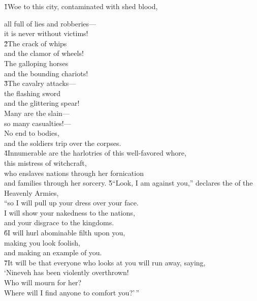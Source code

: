 \v{1}Woe to this city, contaminated with shed blood,

\begin{poetry}
\poeml all full of lies and robberies--- \\
\poemlll       it is never without victims! \\
\poeml \v{2}The crack of whips \\
\poemll    and the clamor of wheels! \\
\poeml The galloping horses \\
\poemll    and the bounding chariots! \\
\poeml \v{3}The cavalry attacks--- \\
\poemll    the flashing sword \\
\poemlll       and the glittering spear! \\
\poeml Many are the slain--- \\
\poemll    so many casualties!--- \\
\poeml No end to bodies, \\
\poemll    and the soldiers trip over the corpses. \\
\poeml \v{4}Innumerable are the harlotries of this well-favored whore, \\
\poemll    this mistress of witchcraft, \\
\poeml who enslaves nations through her fornication \\
\poemll    and families through her sorcery.
\poeml \v{5}``Look, I am against you,'' declares the  of the Heavenly Armies, \\
\poemll    ``so I will pull up your dress over your face. \\
\poeml I will show your nakedness to the nations, \\
\poemll    and your disgrace to the kingdoms. \\
\poeml \v{6}I will hurl abominable filth upon you, \\
\poemll    making you look foolish, \\
\poemlll       and making an example of you. \\
\poeml \v{7}It will be that everyone who looks at you will run away, saying, \\
\poemll    `Nineveh has been violently overthrown! \\
\poemlll       Who will mourn for her? \\
\poemll    Where will I find anyone to comfort you?'\,''

\end{poetry}

